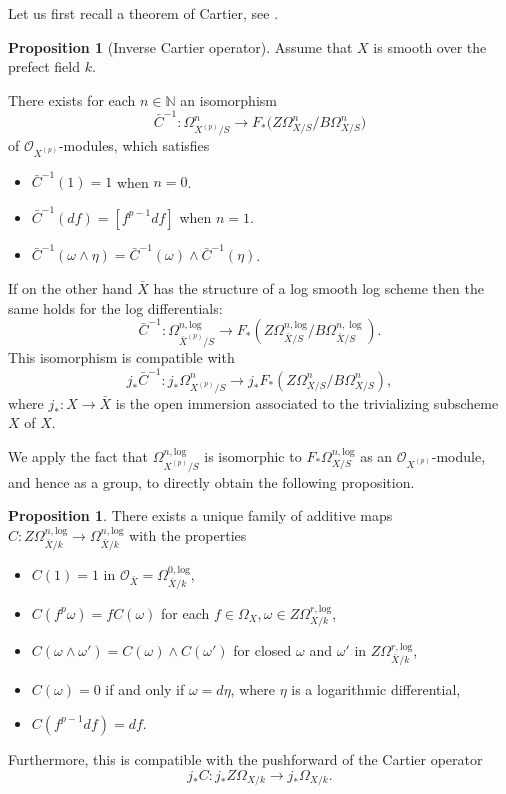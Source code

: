\documentclass{amsart}
\theoremstyle{definition}
\newtheorem{proposition}[theorem]{Proposition}
\newcommand\llog{\mathrm{log}}
\numberwithin{equation}{section}
\begin{document}
Let us first recall a theorem of Cartier, see \cite[Theorem 7.2]{KatzNilpotent}.
\begin{proposition}[Inverse Cartier operator]
	Assume that $X$ is smooth over the prefect field $k$. 
	
	There exists for each $n\in \mathbb{N}$ an isomorphism 
	\[
	\bar{C}^{-1}:\Omega^n_{X^{(p)}/S}\to F_*\big(Z\Omega^n_{X/S}/B\Omega^n_{X/S}\big)
	\]
	of $\mathcal{O}_{X^{(p)}}$-modules, which satisfies
	\begin{itemize}
		\item $\bar{C}^{-1}(1)=1$ when $n=0$.
		\item $\bar{C}^{-1}(df)=[f^{p-1}df]$ when $n=1$.
		\item $\bar{C}^{-1}(\omega \wedge \eta) = \bar{C}^{-1}(\omega)\wedge \bar{C}^{-1}(\eta)$.
	\end{itemize}
	If on the other hand $\bar{X}$ has the structure of a log smooth log scheme then the same holds for the log differentials:
	\[
	\bar{C}^{-1}: \Omega^{n,\llog}_{\bar{X}^{(p)}/S}\to F_*(Z\Omega^{n,\llog}_{\bar{X}/S}/B\Omega^{n,\log}_{\bar{X}/S}).
	\]
	This isomorphism is compatible with 
	\[
	j_*\bar{C}^{-1}: j_*\Omega^n_{X^{(p)}/S}\to j_*F_*(Z\Omega^n_{X/S}/B\Omega^n_{X/S}),
	\]
	where $j_*:X\to \bar{X}$ is the open immersion associated to the trivializing subscheme $X$ of $X$.
	\end{proposition}
	We apply the fact that $\Omega_{X^{(p)}/S}^{n,\llog}$ is isomorphic to $F_*\Omega_{X/S}^{n,\llog}$ as an $\mathcal{O}_{X^{(p)}}$-module, and hence as a group, to directly obtain the following proposition.
\begin{proposition}\label{CartierOnLog}
	There exists a unique family of additive maps $C:Z\Omega_{\bar{X}/k}^{n,\llog}\to\Omega_{\bar{X}/k}^{n,\llog}$ with the properties 
	\begin{itemize}
		\item $C(1)=1$ in $\mathcal{O}_{\bar{X}}=\Omega_{\bar{X}/k}^{0,\llog}$,
		\item $C(f^p \omega)=fC(\omega)$ for each $f\in \Omega_X, \omega \in Z\Omega_{X/k}^{r,\llog}$,
		\item $C(\omega\wedge \omega')=C(\omega)\wedge C(\omega')$ for closed $\omega$ and $\omega'$ in $Z\Omega_{\bar{X}/k}^{r,\llog}$,
		\item $C(\omega)=0$ if and only if $\omega=d\eta$, where $\eta$ is a logarithmic differential,
		\item $C(f^{p-1}df)=df$.
	\end{itemize}
	  Furthermore, this is compatible with the pushforward of the Cartier operator
	  \[
	  j_*C: j_*Z\Omega_{X/k}\to j_*\Omega_{X/k}.
	  \]
\end{proposition}
\end{document}
